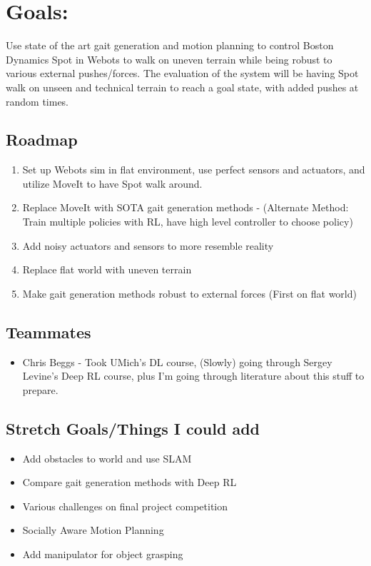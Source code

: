 \documentclass{article}
\theoremstyle{definition}
\theoremstyle{note}
\begin{document}
\section*{Goals:}
Use state of the art gait generation and motion planning to control Boston Dynamics Spot in Webots to 
walk on uneven terrain while being robust to various external pushes/forces. 
The evaluation of the system will be having Spot walk on unseen and technical terrain to reach a goal state, 
with added pushes at random times.



\subsection*{Roadmap}
\begin{enumerate}[label=\arabic*.), start=1] 
\item  Set up Webots sim in flat environment, use perfect sensors and actuators, and utilize MoveIt
to have Spot walk around.
\item Replace MoveIt with SOTA gait generation methods - (Alternate Method: Train multiple policies with RL, have high level controller to choose policy)
\item Add noisy actuators and sensors to more resemble reality
\item Replace flat world with uneven terrain
\item Make gait generation methods robust to external forces (First on flat world)
\end{enumerate}

\subsection*{Teammates}
\begin{itemize}
    \item Chris Beggs - Took UMich's DL course, (Slowly) going through Sergey Levine's Deep RL course, plus I'm going through literature about this stuff to prepare.
\end{itemize}

\subsection*{Stretch Goals/Things I could add}
\begin{itemize}
\item Add obstacles to world and use SLAM
\item Compare gait generation methods with Deep RL
\item Various challenges on final project competition
\item Socially Aware Motion Planning
\item Add manipulator for object grasping
\end{itemize}
\end{document}
